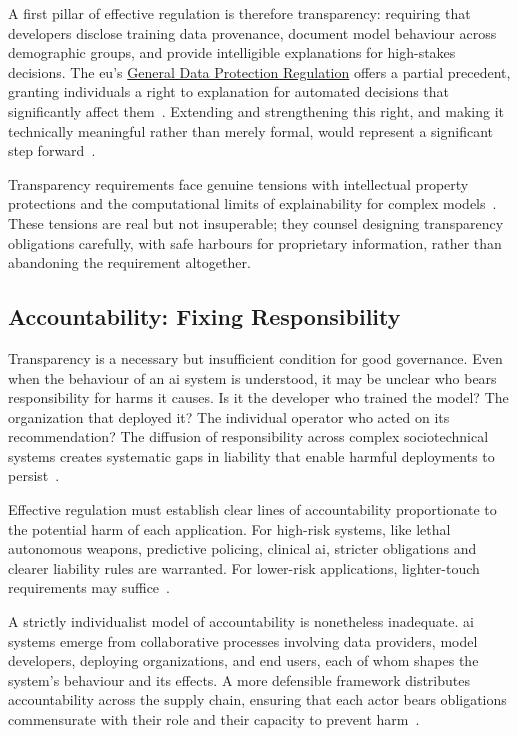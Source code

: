 \documentclass[11pt,showkeys]{essay}
\begin{document}
A first pillar of effective regulation is therefore transparency: requiring that developers disclose training data provenance, document model behaviour across demographic groups, and provide intelligible explanations for high-stakes decisions. The \gls{eu}'s \href{https://gdpr-info.eu/}{General Data Protection Regulation} offers a partial precedent, granting individuals a right to explanation for automated decisions that significantly affect them~\cite{veale_fairness_2018,eu_gdpr_2016}. Extending and strengthening this right, and making it technically meaningful rather than merely formal, would represent a significant step forward~\cite{doshi-velez_towards_2017}.

Transparency requirements face genuine tensions with intellectual property protections and the computational limits of explainability for complex models~\cite{gilpin_explaining_2018}. These tensions are real but not insuperable; they counsel designing transparency obligations carefully, with safe harbours for proprietary information, rather than abandoning the requirement altogether.

\subsection{Accountability: Fixing Responsibility}

Transparency is a necessary but insufficient condition for good governance. Even when the behaviour of an \gls{ai} system is understood, it may be unclear who bears responsibility for harms it causes. Is it the developer who trained the model? The organization that deployed it? The individual operator who acted on its recommendation? The diffusion of responsibility across complex sociotechnical systems creates systematic gaps in liability that enable harmful deployments to persist~\cite{selbst_fairness_2019}.

Effective regulation must establish clear lines of accountability proportionate to the potential harm of each application. For high-risk systems, like lethal autonomous weapons, predictive policing, clinical \gls{ai}, stricter obligations and clearer liability rules are warranted. For lower-risk applications, lighter-touch requirements may suffice~\cite{jobin_global_2019}.

A strictly individualist model of accountability is nonetheless inadequate. \gls{ai} systems emerge from collaborative processes involving data providers, model developers, deploying organizations, and end users, each of whom shapes the system's behaviour and its effects. A more defensible framework distributes accountability across the supply chain, ensuring that each actor bears obligations commensurate with their role and their capacity to prevent harm~\cite{jobin_global_2019}.
\end{document}
